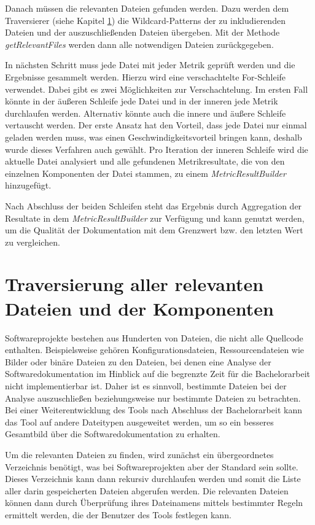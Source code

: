 Danach müssen die relevanten Dateien gefunden werden. Dazu werden dem Traversierer (siehe Kapitel \ref{chapter:traversing}) die Wildcard-Patterns der zu inkludierenden Dateien und der auszuschließenden Dateien übergeben. Mit der Methode \textit{getRelevantFiles} werden dann alle notwendigen Dateien zurückgegeben.

In nächsten Schritt muss jede Datei mit jeder Metrik geprüft werden und die Ergebnisse gesammelt werden. Hierzu wird eine verschachtelte For-Schleife verwendet. Dabei gibt es zwei Möglichkeiten zur Verschachtelung. Im ersten Fall könnte in der äußeren Schleife jede Datei und in der inneren jede Metrik durchlaufen werden. Alternativ könnte auch die innere und äußere Schleife vertauscht werden. Der erste Ansatz hat den Vorteil, dass jede Datei nur einmal geladen werden muss, was einen Geschwindigkeitsvorteil bringen kann, deshalb wurde dieses Verfahren auch gewählt. Pro Iteration der inneren Schleife wird die aktuelle Datei analysiert und alle gefundenen Metrikresultate, die von den einzelnen Komponenten der Datei stammen, zu einem \textit{MetricResultBuilder} hinzugefügt.

Nach Abschluss der beiden Schleifen steht das Ergebnis durch Aggregation der Resultate in dem \textit{MetricResultBuilder} zur Verfügung und kann genutzt werden, um die Qualität der Dokumentation mit dem Grenzwert bzw. den letzten Wert zu vergleichen. 

\section{Traversierung aller relevanten Dateien und der Komponenten}\label{chapter:traversing}
Softwareprojekte bestehen aus Hunderten von Dateien, die nicht alle Quellcode enthalten. Beispielsweise gehören Konfigurationsdateien, Ressourcendateien wie Bilder oder binäre Dateien zu den Dateien, bei denen eine Analyse der Softwaredokumentation im Hinblick auf die begrenzte Zeit für die Bachelorarbeit nicht implementierbar ist. Daher ist es sinnvoll, bestimmte Dateien bei der Analyse auszuschließen beziehungsweise nur bestimmte Dateien zu betrachten. Bei einer Weiterentwicklung des Tools nach Abschluss der Bachelorarbeit kann das Tool auf andere Dateitypen ausgeweitet werden, um so ein besseres Gesamtbild über die Softwaredokumentation zu erhalten.

Um die relevanten Dateien zu finden, wird zunächst ein übergeordnetes Verzeichnis benötigt, was bei Softwareprojekten aber der Standard sein sollte. Dieses Verzeichnis kann dann rekursiv durchlaufen werden und somit die Liste aller darin gespeicherten Dateien abgerufen werden. Die relevanten Dateien können dann durch Überprüfung ihres Dateinamens mittels bestimmter Regeln ermittelt werden, die der Benutzer des Tools festlegen kann.

